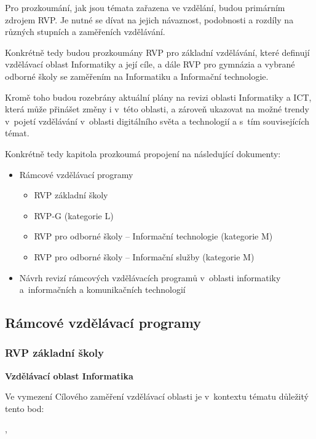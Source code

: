 Pro prozkoumání, jak jsou témata zařazena ve vzdělání, budou primárním zdrojem RVP. Je nutné se dívat na jejich návaznost, podobnosti a rozdíly na různých stupních a zaměřeních vzdělávání.

Konkrétně tedy budou prozkoumány RVP pro základní vzdělávání, které definují vzdělávací oblast Informatiky a její cíle, a dále RVP pro gymnázia a vybrané odborné školy se zaměřením na Informatiku a Informační technologie. 

Kromě toho budou rozebrány aktuální plány na revizi oblasti Informatiky a ICT, která může přinášet změny i v~této oblasti, a zároveň ukazovat na možné trendy v~pojetí vzdělávání v~oblasti digitálního světa a technologií a s~tím souvisejících témat.

Konkrétně tedy kapitola prozkoumá propojení na následující dokumenty:

\begin{itemize}
\item Rámcové vzdělávací programy
	\begin{itemize}
    \item RVP základní školy \citep{rvp-zs}
    \item RVP-G (kategorie L) \citep{rvp-g}
    \item RVP pro odborné školy -- Informační technologie \citep{rvp-it} (kategorie M)
    \item RVP pro odborné školy -- Informační služby\citep{rvp-is} (kategorie M)
	\end{itemize}
\item Návrh revizí rámcových vzdělávacích programů v oblasti informatiky a informačních a komunikačních technologií \citep{revize}
\end{itemize}

\subsection{Rámcové vzdělávací programy}

\subsubsection*{RVP základní školy}

\textbf{Vzdělávací oblast Informatika}

Ve vymezení Cílového zaměření vzdělávací oblasti je v~kontextu tématu důležitý tento bod:

\begin{displayquote}
	\citep{rvp-zs},
\end{displayquote}

